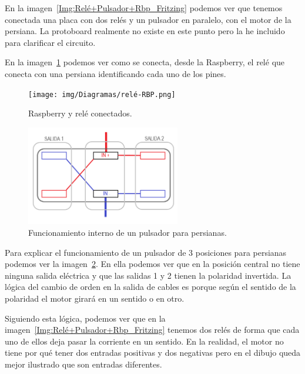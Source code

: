 En la imagen~\ref{Img:Relé+Pulsador+Rbp_Fritzing} podemos ver que tenemos conectada una placa con dos relés y un pulsador en paralelo, con el motor de la persiana. La protoboard realmente no existe en este punto pero la he incluido para clarificar el circuito.

En la imagen~\ref{Img:Relé+Rbp_Fritzing} podemos ver como se conecta, desde la Raspberry, el relé que conecta con una persiana identificando cada uno de los pines.

\begin{figure}[h]
    \centering
    \texttt{[image: img/Diagramas/relé-RBP.png]}
    \caption{Raspberry y relé conectados.} \label{Img:Relé+Rbp_Fritzing}
\end{figure}

\begin{figure}[h]
    \centering
    \includegraphics[width=0.6\textwidth]{img/Diagramas/PulsadorInterno.png}
    \caption{Funcionamiento interno de un pulsador para persianas.} \label{img:PulsadorInterno}
\end{figure}


Para explicar el funcionamiento de un pulsador de 3 posiciones para persianas podemos ver la imagen~\ref{img:PulsadorInterno}. En ella podemos ver que en la posición central no tiene ninguna salida eléctrica y que las salidas 1 y 2 tienen la polaridad invertida. La lógica del cambio de orden en la salida de cables es porque según el sentido de la polaridad el motor girará en un sentido o en otro. %

Siguiendo esta lógica, podemos ver que en la imagen~\ref{Img:Relé+Pulsador+Rbp_Fritzing} tenemos dos relés de forma que cada uno de ellos deja pasar la corriente en un sentido. En la realidad, el motor no tiene por qué tener dos entradas positivas y dos negativas pero en el dibujo queda mejor ilustrado que son entradas diferentes.

